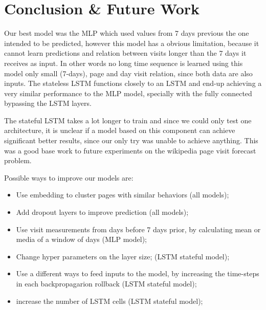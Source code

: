 \section{Conclusion \& Future Work}
\label{sec:conclusion}

Our best model was the MLP which used values from 7 days previous the one intended to be predicted,
however this model has a obvious limitation, because it cannot learn predictions and relation between visits longer than the 7 days it receives as input.
In other words no long time sequence is learned using this model only small (7-days), page and day visit relation, since both data are also inputs.
The stateless LSTM functions closely to an LSTM and end-up achieving a very similar performance to the MLP model, specially with the fully connected bypassing the LSTM layers.

The stateful LSTM takes a lot longer to train and since we could only test one architecture,
it is unclear if a model based on this component can achieve significant better results,
since our only try was unable to achieve anything.
This was a good base work to future experiments on the wikipedia page visit forecast problem.

Possible ways to improve our models are:
\begin{itemize}
	\item Use embedding to cluster pages with similar behaviors (all models);
	\item Add dropout layers to improve prediction (all models);
	\item Use visit measurements from days before 7 days prior, by calculating mean or media of a window of days (MLP model);
	\item Change hyper parameters on the layer size; (LSTM stateful model);
	\item Use a different ways to feed inputs to the model, by increasing the time-steps in each backpropagarion rollback (LSTM stateful model);
	\item increase the number of LSTM cells (LSTM stateful model);
\end{itemize}


